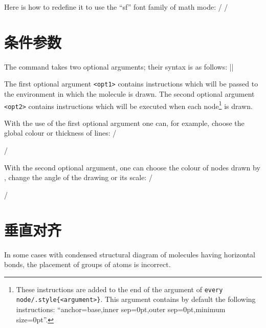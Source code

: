 \documentclass[10pt]{article}
\begin{document}
Here is how to redefine it to use the ``sf'' font family of math mode:
/\renewcommand*\printatom[1]{\ensuremath{\mathsf{#1}}}
/

\section{条件参数}\label{arguments.optionnels}
The \idx{\chemfig} command takes two optional arguments; their syntax is as follows:
\centerverb||
\smallskip

The first optional argument \verb-<opt1>- contains \TIKZ instructions which will be passed to the  environment in which the molecule is drawn. The second optional argument \verb-<opt2>- contains \TIKZ instructions which will be executed when each node\footnote{These instructions are added to the end of the argument of \texttt{every node/.style\{<argument>\}}. This argument contains by default the following instructions: ``{\ttfamily anchor=base,inner sep=0pt,outer sep=0pt,minimum size=0pt}''.} is drawn.

With the use of the first optional argument one can, for example, choose the global colour or thickness of lines:
/\par\medskip
{}\par\medskip
{}/

With the second optional argument, one can choose the colour of nodes drawn by \TIKZ, change the angle of the drawing or its scale:
/\par\medskip
{}\par\medskip
{}\par\medskip
{}\par\medskip
{}/

\section{垂直对齐}\label{alignement.vertical}
In some cases with condensed structural diagram of molecules having horizontal bonds, the placement of groups of atoms is incorrect.
\end{document}
